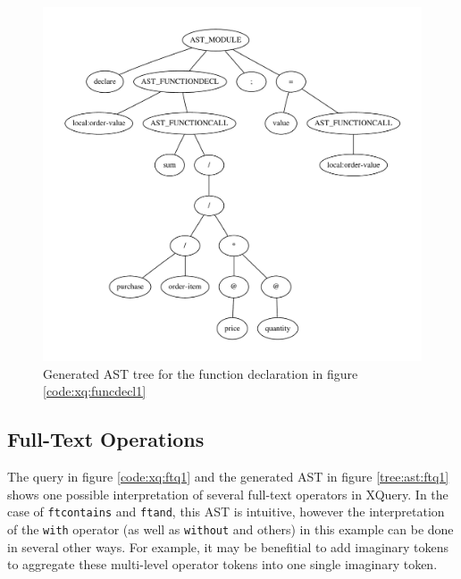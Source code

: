 \pagebreak
\begin{figure}[h!]

\caption{Function declaration used to generate the AST in figure
\ref{tree:ast:funcdecl1}}
\label{code:xq:funcdecl1}
\centering
 \includegraphics[width=1\textwidth]{img/graphs/funcdecl1}
\caption{Generated AST tree for the function declaration in figure \ref{code:xq:funcdecl1}}
\label{tree:ast:funcdecl1}
\end{figure}

\subsection{Full-Text Operations}
The query in figure \ref{code:xq:ftq1} and the generated AST in figure
\ref{tree:ast:ftq1} shows one possible interpretation of several full-text 
operators in XQuery. In the case of \verb!ftcontains! and \verb!ftand!, this AST
is intuitive, however the interpretation of the \verb!with! operator (as well
as \verb!without! and others) in this example can be done in several other ways.
For example, it may be benefitial to add imaginary tokens to aggregate these
multi-level operator tokens into one single imaginary token.

